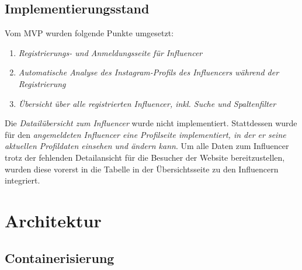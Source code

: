 \documentclass[conference,a4paper,flushend]{cs-techrep}
\begin{document}
\subsection{Implementierungsstand}
Vom MVP wurden folgende Punkte umgesetzt:
\begin{enumerate}
\item{\textit{Registrierungs- und Anmeldungsseite für Influencer}}
\item{\textit{Automatische Analyse des Instagram-Profils des Influencers während der Registrierung}}
\item{\textit{Übersicht über alle registrierten Influencer, inkl. Suche und Spaltenfilter}}
\end{enumerate}

Die \textit{Datailübersicht zum Influencer} wurde nicht implementiert. Stattdessen wurde für den \textit{angemeldeten Influencer eine Profilseite implementiert, in der er seine aktuellen Profildaten einsehen und ändern kann}. Um alle Daten zum Influencer trotz der fehlenden Detailansicht für die Besucher der Website bereitzustellen, wurden diese vorerst in die Tabelle in der Übersichtsseite zu den Influencern integriert. \\


\section{Architektur}

\subsection{Containerisierung}
\end{document}

